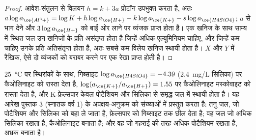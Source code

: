 \begin{proof}
आवेश-संतुलन से विलयन $h = k + 3a$ प्रोटॉन उपभुक्त करता है, अतः $a\log
a_{\ce{Al^3+}} = \log K + h\log a_{\ce{H+}} - k\log a_{\ce{K+}} - s\log
a_{\ce{H4SiO4}}$; $a$ से भाग देने और $3\log a_{\ce{H+}}$ को बाईं ओर लाने पर
व्यंजक प्राप्त होता है। एक खनिज के साथ साम्य में स्थित जल
उन खनिजों के प्रति असंतृप्त होता है जिन्हें अधिक एल्यूमिनियम चाहिए, और
जिन्हें कम चाहिए उनके प्रति अतिसंतृप्त होता है, अतः सबसे कम विलेय खनिज
स्थायी होता है। $X$ और $Y$ में रैखिक, ऐसे दो व्यंजकों को बराबर करने पर एक रेखा प्राप्त होती है।
\end{proof}

\qty{25}{\celsius} पर स्थिरांकों के साथ, गिब्साइट
$\log a_{\ce{H4SiO4}} = -4.39$ (\qty{2.4}{mg/L} सिलिका) पर कैओलिनाइट को रास्ता देता है,
$\log(a_{\ce{K+}}/a_{\ce{H+}}) = 1.55$ पर कैओलिनाइट मस्कोवाइट को रास्ता देता है, और K-फ़ेल्सपार
केवल पोटैशियम और सिलिका से समृद्ध जल में स्थायी होता है। यह आरेख पुस्तक 3 (स्नातक वर्ष 1) के
अपक्षय-अनुक्रम को संख्याओं में प्रस्तुत करता है: तनु जल, जो पोटैशियम और सिलिका को बहा ले जाता है,
फ़ेल्सपार को गिब्साइट तक छील देता है; वह जल जो अधिक सिलिका रखता है,
कैओलिनाइट बनाता है; और वह जो गहराई की तरह अधिक पोटैशियम रखता है,
अभ्रक बनाता है।


